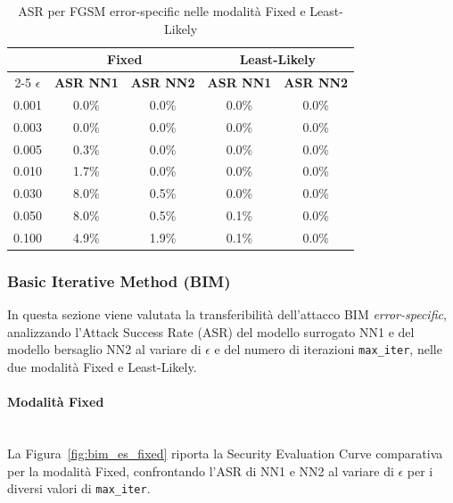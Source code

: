\documentclass[a4paper, 12pt]{article}
\begin{document}
\begin{table}[htbp]
    \centering
    \vspace{0.2cm}
    \small
    \setlength{\tabcolsep}{8pt}
    \renewcommand{\arraystretch}{1.2}
    \begin{tabular}{| c | cc | cc |}
        \hline
        & \multicolumn{2}{c|}{\textbf{Fixed}}
        & \multicolumn{2}{c|}{\textbf{Least-Likely}} \\
        \cline{2-5}
        \textbf{$\epsilon$}
        & \textbf{ASR NN1} & \textbf{ASR NN2}
        & \textbf{ASR NN1} & \textbf{ASR NN2} \\
        \hline
        0.001 & 0.0\% & 0.0\% & 0.0\% & 0.0\% \\
        0.003 & 0.0\% & 0.0\% & 0.0\% & 0.0\% \\
        0.005 & 0.3\% & 0.0\% & 0.0\% & 0.0\% \\
        0.010 & 1.7\% & 0.0\% & 0.0\% & 0.0\% \\
        0.030 & 8.0\% & 0.5\% & 0.0\% & 0.0\% \\
        0.050 & 8.0\% & 0.5\% & 0.1\% & 0.0\% \\
        0.100 & 4.9\% & 1.9\% & 0.1\% & 0.0\% \\
        \hline
    \end{tabular}
    \caption{ASR per FGSM error-specific nelle modalità Fixed e Least-Likely}
    \label{tab:fgsm_es_transferability}
\end{table}



\subsubsection{Basic Iterative Method (BIM)}
In questa sezione viene valutata la transferibilità dell'attacco BIM 
\textit{error-specific}, analizzando l'Attack Success Rate (ASR) del modello 
surrogato NN1 e del modello bersaglio NN2 al variare di $\epsilon$ e del numero 
di iterazioni \texttt{max\_iter}, nelle due modalità Fixed e Least-Likely.

\paragraph*{Modalità Fixed}\mbox{}\\
La Figura~\ref{fig:bim_es_fixed} riporta la Security Evaluation Curve comparativa 
per la modalità Fixed, confrontando l'ASR di NN1 e NN2 al variare di $\epsilon$ 
per i diversi valori di \texttt{max\_iter}.
\end{document}
